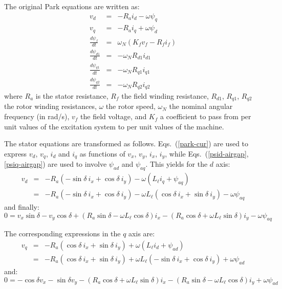 The original Park equations are written as:
\begin{eqnarray}
v_d & = & - R_a i_d - \omega \psi_q \label{park-vd} \\
v_q & = & - R_a i_q + \omega \psi_d \label{park-vq} \\
\frac{d\psi_f}{dt} & = & \omega_N ( K_f v_f - R_f i_f ) \label{park-psif} \\
\frac{d\psi_{d1}}{dt} & = & - \omega_N R_{d1} i_{d1} \label{park-psid1} \\
\frac{d\psi_{q1}}{dt} & = & - \omega_N R_{q1} i_{q1} \label{park-psiq1} \\
\frac{d\psi_{q2}}{dt} & = & - \omega_N R_{q2} i_{q2} \label{park-psiq2}
\end{eqnarray}
where $R_a$ is the stator resistance, $R_f$ the field winding resistance, $R_{d1}$, $R_{q1}$, $R_{q2}$ the rotor winding resistances, $\omega$ the rotor speed, $\omega_N$ the nominal angular frequency (in rad/s), $v_f$ the field voltage, and $K_f$ a coefficient to pass from per unit values of the excitation system to per unit values of the machine.

The stator equations are transformed as follows. Eqs.~(\ref{park-cur}) are used to express $v_d$, $v_q$, $i_d$ and $i_q$ as functions of $v_x$, $v_y$, $i_x$, $i_y$, while Eqs.~(\ref{psid-airgap}, \ref{psiq-airgap}) are used to involve $\psi_{ad}$ and $\psi_{aq}$. This yields for the $d$ axis:
\begin{eqnarray*}
v_d & = & - R_a ( - \sin \delta \: i_x + \cos \delta \: i_y ) - \omega ( L_\ell i_q + \psi_{aq} ) \\
    & = & - R_a ( - \sin \delta \: i_x + \cos \delta \: i_y ) - \omega L_\ell ( \cos \delta \: i_x + \sin \delta \: i_y ) - \omega \psi_{aq}
\end{eqnarray*}
and finally:
\begin{equation}\label{stator-d-xy}
0 = v_x \sin \delta - v_y \cos \delta + ( R_a \sin \delta - \omega L_\ell \cos \delta ) i_x - ( R_a \cos \delta + \omega L_\ell \sin \delta ) i_y - \omega \psi_{aq}
\end{equation}

The corresponding expressions in the $q$ axis are:
\begin{eqnarray}
v_q & = & - R_a ( \cos \delta \: i_x + \sin \delta \: i_y ) + \omega ( L_\ell i_d + \psi_{ad} ) \nonumber \\
    & = & - R_a ( \cos \delta \: i_x + \sin \delta \: i_y ) + \omega L_\ell ( - \sin \delta \: i_x + \cos \delta \: i_y ) + \omega \psi_{ad} \label{vq-xy}
\end{eqnarray}
and:
\begin{equation}\label{stator-q-xy}
0 = - \cos \delta v_x - \sin \delta v_y - ( R_a \cos \delta + \omega L_\ell \sin \delta ) i_x - ( R_a \sin \delta - \omega L_\ell \cos \delta ) i_y + \omega \psi_{ad}
\end{equation}

